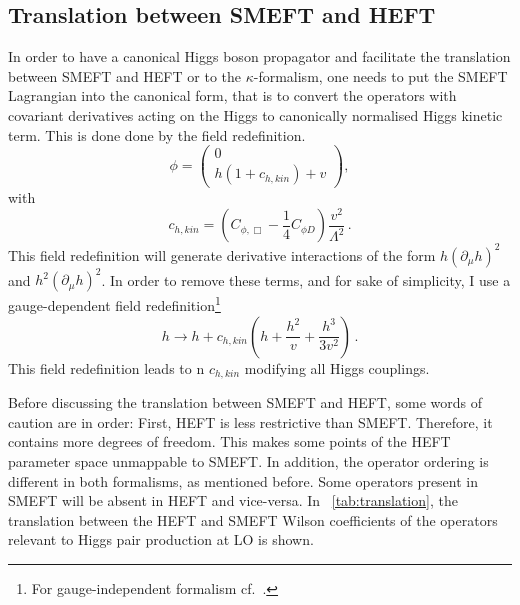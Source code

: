 \subsection{Translation between SMEFT and HEFT }
\par In order to have a canonical Higgs boson propagator and facilitate the translation between SMEFT and HEFT or to the $\kappa$-formalism, one needs to put the SMEFT Lagrangian into the canonical form, that is to convert the operators with covariant derivatives acting on the Higgs to canonically normalised Higgs kinetic term. This is done done by the field redefinition.
\begin{equation}
	\phi=\left( \begin{array}{c} 0 \\ h(1+c_{h,kin}) + v \end{array} \right),
\end{equation} 
with 
\begin{equation}
	c_{h,kin}=\left(C_{\phi,\Box}-\frac{1}{4}C_{\phi D}\right) \frac{v^2}{\Lambda^2}\,.
\end{equation}
This field redefinition will generate derivative interactions of the form $h(\partial_{\mu}h)^2$ and $h^2(\partial_{\mu}h)^2$. In order to remove these terms, and for sake of simplicity, I use a gauge-dependent field redefinition\footnote{For gauge-independent formalism cf.~\cite{Hartmann:2015aia}.}
\begin{equation}
	h \to h + c_{h,kin}\left( h +\frac{h^2}{v}+\frac{h^3}{3v^2}\right)\,. \label{fieldref}
\end{equation}
This field redefinition leads to n $c_{h,kin}$ modifying all Higgs couplings. 
\par Before discussing the translation between SMEFT and HEFT, some words of caution are in order: First, HEFT is less restrictive than SMEFT. Therefore, it contains more degrees of freedom. This makes some points of the HEFT parameter space unmappable to SMEFT. In addition, the operator ordering is different in both formalisms, as mentioned before. Some operators present in SMEFT will be absent in HEFT and vice-versa.  In ~\autoref{tab:translation}, the translation between the HEFT and SMEFT Wilson coefficients of the operators relevant to Higgs pair production at LO is shown. 
